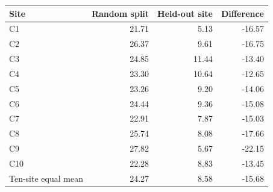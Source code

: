 \begin{tabular}{@{}lrrr@{}}
\toprule
Site & Random split & Held-out site & Difference\\
\midrule
C1 & 21.71 & 5.13 & -16.57 \\
C2 & 26.37 & 9.61 & -16.75 \\
C3 & 24.85 & 11.44 & -13.40 \\
C4 & 23.30 & 10.64 & -12.65 \\
C5 & 23.26 & 9.20 & -14.06 \\
C6 & 24.44 & 9.36 & -15.08 \\
C7 & 22.91 & 7.87 & -15.03 \\
C8 & 25.74 & 8.08 & -17.66 \\
C9 & 27.82 & 5.67 & -22.15 \\
C10 & 22.28 & 8.83 & -13.45 \\
\midrule
Ten-site equal mean & 24.27 & 8.58 & -15.68 \\
\bottomrule
\end{tabular}
